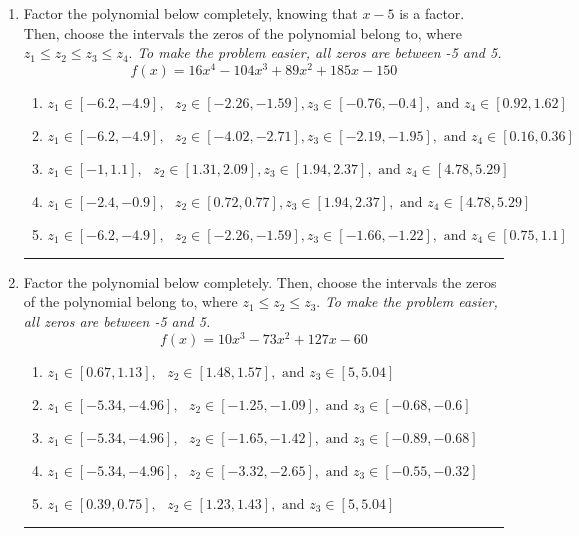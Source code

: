 \documentclass[14pt]{extbook}
\newcommand{\litem}[1]{\item#1\hspace*{-1cm}\rule{\textwidth}{0.4pt}}
\begin{document}
\begin{enumerate}
{\begin{enumerate}[label=\Alph*.]
\end{enumerate} }
\litem{
Factor the polynomial below completely, knowing that $x-5$ is a factor. Then, choose the intervals the zeros of the polynomial belong to, where $z_1 \leq z_2 \leq z_3 \leq z_4$. \textit{To make the problem easier, all zeros are between -5 and 5.}\[ f(x) = 16x^{4} -104 x^{3} +89 x^{2} +185 x -150 \]\begin{enumerate}[label=\Alph*.]
\item \( z_1 \in [-6.2, -4.9], \text{   }  z_2 \in [-2.26, -1.59], z_3 \in [-0.76, -0.4], \text{   and   } z_4 \in [0.92, 1.62] \)
\item \( z_1 \in [-6.2, -4.9], \text{   }  z_2 \in [-4.02, -2.71], z_3 \in [-2.19, -1.95], \text{   and   } z_4 \in [0.16, 0.36] \)
\item \( z_1 \in [-1, 1.1], \text{   }  z_2 \in [1.31, 2.09], z_3 \in [1.94, 2.37], \text{   and   } z_4 \in [4.78, 5.29] \)
\item \( z_1 \in [-2.4, -0.9], \text{   }  z_2 \in [0.72, 0.77], z_3 \in [1.94, 2.37], \text{   and   } z_4 \in [4.78, 5.29] \)
\item \( z_1 \in [-6.2, -4.9], \text{   }  z_2 \in [-2.26, -1.59], z_3 \in [-1.66, -1.22], \text{   and   } z_4 \in [0.75, 1.1] \)

\end{enumerate} }
\litem{
Factor the polynomial below completely. Then, choose the intervals the zeros of the polynomial belong to, where $z_1 \leq z_2 \leq z_3$. \textit{To make the problem easier, all zeros are between -5 and 5.}\[ f(x) = 10x^{3} -73 x^{2} +127 x -60 \]\begin{enumerate}[label=\Alph*.]
\item \( z_1 \in [0.67, 1.13], \text{   }  z_2 \in [1.48, 1.57], \text{   and   } z_3 \in [5, 5.04] \)
\item \( z_1 \in [-5.34, -4.96], \text{   }  z_2 \in [-1.25, -1.09], \text{   and   } z_3 \in [-0.68, -0.6] \)
\item \( z_1 \in [-5.34, -4.96], \text{   }  z_2 \in [-1.65, -1.42], \text{   and   } z_3 \in [-0.89, -0.68] \)
\item \( z_1 \in [-5.34, -4.96], \text{   }  z_2 \in [-3.32, -2.65], \text{   and   } z_3 \in [-0.55, -0.32] \)
\item \( z_1 \in [0.39, 0.75], \text{   }  z_2 \in [1.23, 1.43], \text{   and   } z_3 \in [5, 5.04] \)


\end{enumerate}}
\end{enumerate}
\end{document}
